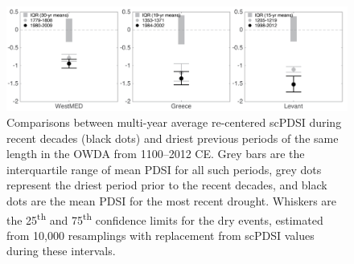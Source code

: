 \documentclass[draft,jgr]{AGUTeX}
\begin{document}
\begin{figure}
\center
\includegraphics[width=1.0\columnwidth]{fig_12_pdsi_boxplot.png}
\caption{Comparisons between multi-year average re-centered scPDSI during recent decades (black dots) and driest previous periods of the same length in the OWDA from 1100--2012 CE. Grey bars are the interquartile range of mean PDSI for all such periods, grey dots represent the driest period prior to the recent decades, and black dots are the mean PDSI for the most recent drought. Whiskers are the 25\textsuperscript{th} and 75\textsuperscript{th} confidence limits for the dry events, estimated from 10,000 resamplings with replacement from scPDSI values during these intervals.}\label{placeholder}
\end{figure}

\end{document}

